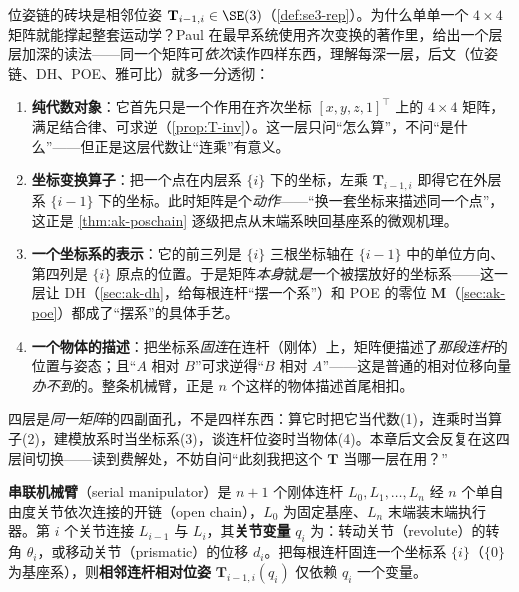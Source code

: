 \begin{insight}
位姿链的砖块是相邻位姿 $\mathbf{T}_{i-1,i}\in\SE(3)$（\cref{def:se3-rep}）。为什么单单一个 $4\times4$ 矩阵就能撑起整套运动学？Paul 在最早系统使用齐次变换的著作里，给出一个层层加深的读法\cite{paul1981robot}——同一个矩阵可\emph{依次}读作四样东西，理解每深一层，后文（位姿链、DH、POE、雅可比）就多一分透彻：
\begin{enumerate}
  \item \textbf{纯代数对象}：它首先只是一个作用在齐次坐标 $[x,y,z,1]^\top$ 上的 $4\times4$ 矩阵，满足结合律、可求逆（\cref{prop:T-inv}）。这一层只问“怎么算”，不问“是什么”——但正是这层代数让“连乘”有意义。
  \item \textbf{坐标变换算子}：把一个点在内层系 $\{i\}$ 下的坐标，左乘 $\mathbf{T}_{i-1,i}$ 即得它在外层系 $\{i-1\}$ 下的坐标。此时矩阵是个\emph{动作}——“换一套坐标来描述同一个点”，这正是 \cref{thm:ak-poschain} 逐级把点从末端系映回基座系的微观机理。
  \item \textbf{一个坐标系的表示}：它的前三列是 $\{i\}$ 三根坐标轴在 $\{i-1\}$ 中的单位方向、第四列是 $\{i\}$ 原点的位置\cite{paul1981robot}。于是矩阵\emph{本身}就\emph{是}一个被摆放好的坐标系——这一层让 DH（\cref{sec:ak-dh}，给每根连杆“摆一个系”）和 POE 的零位 $\mathbf{M}$（\cref{sec:ak-poe}）都成了“摆系”的具体手艺。
  \item \textbf{一个物体的描述}：把坐标系\emph{固连}在连杆（刚体）上，矩阵便描述了\emph{那段连杆}的位置与姿态；且“$A$ 相对 $B$”可求逆得“$B$ 相对 $A$”\cite{paul1981robot}——这是普通的相对位移向量\emph{办不到}的。整条机械臂，正是 $n$ 个这样的物体描述首尾相扣。
\end{enumerate}
四层是\emph{同一矩阵}的四副面孔，不是四样东西：算它时把它当代数(1)，连乘时当算子(2)，建模放系时当坐标系(3)，谈连杆位姿时当物体(4)。本章后文会反复在这四层间切换——读到费解处，不妨自问“此刻我把这个 $\mathbf{T}$ 当哪一层在用？”
\end{insight}

\begin{definition}[串联机械臂与关节变量]\label{def:ak-serial}
\textbf{串联机械臂}（serial manipulator）是 $n+1$ 个刚体连杆 $L_0,L_1,\dots,L_n$ 经 $n$ 个单自由度关节依次连接的开链（open chain），$L_0$ 为固定基座、$L_n$ 末端装末端执行器。第 $i$ 个关节连接 $L_{i-1}$ 与 $L_i$，其\textbf{关节变量} $q_i$ 为：转动关节（revolute）的转角 $\theta_i$，或移动关节（prismatic）的位移 $d_i$。把每根连杆固连一个坐标系 $\{i\}$（$\{0\}$ 为基座系），则\textbf{相邻连杆相对位姿} $\mathbf{T}_{i-1,i}(q_i)$ 仅依赖 $q_i$ 一个变量。
\end{definition}

